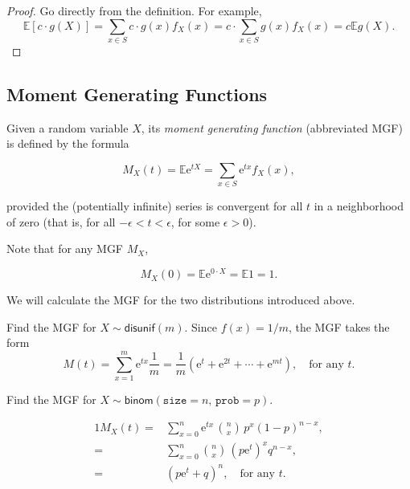 \documentclass[]{book}
\numberwithin{equation}{chapter}
\numberwithin{figure}{chapter}
\theoremstyle{plain}
\theoremstyle{definition}
\theoremstyle{remark}
\theoremstyle{definition}
\theoremstyle{definition}
\theoremstyle{remark}
\let\BeginKnitrBlock\begin \let\EndKnitrBlock\end
\begin{document}
\BeginKnitrBlock{proof}
\iffalse {Proof. } \fi Go directly from the definition. For example,
\[ \mathbb{E}[c \cdot
g(X)] = \sum_{x \in S} c \cdot g(x) f_{X}(x) = c \cdot \sum_{x \in S}
g(x) f_{X}(x) = c \mathbb{E} g(X).  \]
\EndKnitrBlock{proof}

\subsection{Moment Generating Functions}\label{sub-mgfs}

\BeginKnitrBlock{definition}
\protect\hypertarget{def:unnamed-chunk-215}{}{\label{def:unnamed-chunk-215}}Given
a random variable \(X\), its \emph{moment generating function}
(abbreviated MGF) is defined by the formula

\begin{equation}
M_{X}(t)=\mathbb{E}\mathrm{e}^{tX}=\sum_{x\in S}\mathrm{e}^{tx}f_{X}(x),
\end{equation}

provided the (potentially infinite) series is convergent for all \(t\)
in a neighborhood of zero (that is, for all
\(-\epsilon < t < \epsilon\), for some \(\epsilon > 0\)).
\EndKnitrBlock{definition}

Note that for any MGF \(M_{X}\),

\begin{equation}
M_{X}(0) = \mathbb{E} \mathrm{e}^{0 \cdot X} = \mathbb{E} 1 = 1.
\end{equation}

We will calculate the MGF for the two distributions introduced above.

\bigskip

\BeginKnitrBlock{example}
\protect\hypertarget{ex:unnamed-chunk-216}{}{\label{ex:unnamed-chunk-216}}Find
the MGF for \(X\sim\mathsf{disunif}(m)\). Since \(f(x) = 1/m\), the MGF
takes the form \[ M(t) = \sum_{x = 1}^{m} \mathrm{e}^{tx}
\frac{1}{m} = \frac{1}{m}(\mathrm{e}^{t} + \mathrm{e}^{2t} + \cdots +
\mathrm{e}^{mt}),\quad \mbox{for any $t$.}  \]
\EndKnitrBlock{example}

\bigskip

\BeginKnitrBlock{example}
\protect\hypertarget{ex:unnamed-chunk-217}{}{\label{ex:unnamed-chunk-217}}Find
the MGF for \(X\sim\mathsf{binom}(\mathtt{size}=n,\,\mathtt{prob}=p)\).
\EndKnitrBlock{example}

\begin{alignat*}{1}
M_{X}(t)= & \sum_{x=0}^{n}\mathrm{e}^{tx}\,{n \choose x}\, p^{x}(1-p)^{n-x},\\
= & \sum_{x=0}^{n}{n \choose x}\,(p\mathrm{e}^{t})^{x}q^{n-x},\\
= & (p\mathrm{e}^{t}+q)^{n},\quad \mbox{for any $t$.}
\end{alignat*}
\end{document}
